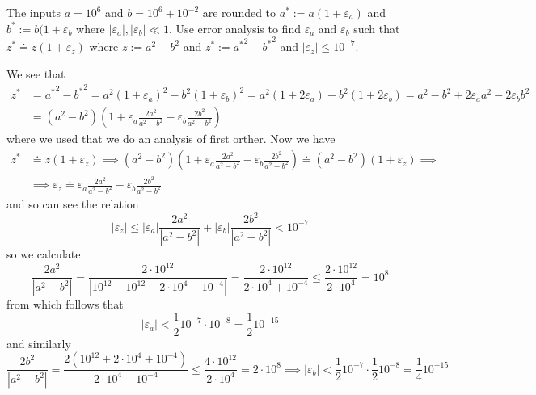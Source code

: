 \begin{example}
   The inputs \(a = 10^6\) and \(b = 10^6 + 10^{-2}\) are rounded to \(a^\ast := a(1 + \varepsilon_a)\) and \(b^\ast := b(1 + \varepsilon_b\) where \(|\varepsilon_a|, |\varepsilon_b| \ll 1\).
   Use error analysis to find \(\varepsilon_a\) and \(\varepsilon_b\) such that \(z^\ast \doteq z(1 + \varepsilon_z)\) where \(z := a^2 - b^2\) and \(z^\ast := {a^\ast}^2 - {b^\ast}^2\) and \(|\varepsilon_z| \leq 10^{-7}\).

   We see that
   \begin{equation*}
      \begin{split}
         z^\ast & = {a^\ast}^2 - {b^\ast}^2 = a^2(1+ \varepsilon_a)^2 - b^2(1 + \varepsilon_b)^2 = a^2(1 + 2\varepsilon_a) - b^2(1 + 2\varepsilon_b) = a^2 - b^2 + 2 \varepsilon_a a^2 - 2\varepsilon_b b^2\\
                & = (a^2 - b^2)\left(1 + \varepsilon_a \frac{2a^2}{a^2 - b^2} - \varepsilon_b \frac{2b^2}{a^2 - b^2}\right)
      \end{split}
   \end{equation*}
   where we used that we do an analysis of first orther.
   Now we have
   \begin{equation*}
      \begin{split}
         z^\ast & \doteq z(1 + \varepsilon_z) \implies (a^2 - b^2)\left(1 + \varepsilon_a \frac{2a^2}{a^2 - b^2} - \varepsilon_b \frac{2b^2}{a^2 - b^2}\right) \doteq (a^2 - b^2)(1 + \varepsilon_z) \implies \\
         & \implies \varepsilon_z \doteq \varepsilon_a \frac{2a^2}{a^2 - b^2} - \varepsilon_b \frac{2b^2}{a^2 - b^2}
      \end{split}
   \end{equation*}
   and so can see the relation
   \[|\varepsilon_z| \leq |\varepsilon_a| \frac{2a^2}{|a^2 - b^2|} + |\varepsilon_b| \frac{2b^2}{|a^2 - b^2|} < 10^{-7}\]
   so we calculate
   \[\frac{2a^2}{|a^2 - b^2|} = \frac{2 \cdot 10^{12}}{|10^{12} - 10^{12} - 2 \cdot 10^4 - 10^{-4}|} = \frac{2 \cdot 10^{12}}{2 \cdot 10^4 + 10^{-4}} \leq \frac{2 \cdot 10^{12}}{2 \cdot 10^4} = 10^8\]
   from which follows that
   \[|\varepsilon_a| < \frac{1}{2} 10^{-7} \cdot 10^{-8} = \frac{1}{2} 10^{-15}\]
   and similarly
   \[\frac{2b^2}{|a^2 - b^2|} = \frac{2(10^{12} + 2 \cdot 10^4 + 10^{-4})}{2 \cdot 10^4 + 10^{-4}} \leq \frac{4 \cdot 10^{12}}{2 \cdot 10^4} = 2 \cdot 10^8 \implies |\varepsilon_b| < \frac{1}{2} 10^{-7} \cdot \frac{1}{2} 10^{-8} = \frac{1}{4} 10^{-15}\]
\end{example}

